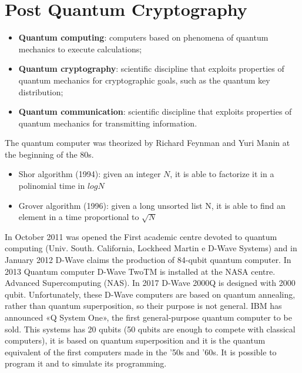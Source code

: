 \documentclass[a4paper, 10pt, titlepage]{article}
\begin{document}
\section{Post Quantum Cryptography}
\begin{itemize}
\item \textbf{Quantum computing}: computers based on phenomena of quantum mechanics to execute calculations;
\item \textbf{Quantum cryptography}: scientific discipline that exploits properties of quantum mechanics for cryptographic goals, such as the quantum key distribution;
\item \textbf{Quantum communication}: scientific discipline that exploits properties of quantum mechanics for transmitting information.
\end{itemize}
The quantum computer was theorized by Richard Feynman and Yuri Manin at the beginning of the 80s.
\begin{itemize}
\item Shor algorithm (1994): given an integer $N$, it is able to  factorize it in a polinomial time in $log N$
\item Grover algorithm (1996): given a long unsorted list N, it is able to find an element in a time proportional to $\sqrt{N}$
\end{itemize}
In October 2011 was opened the First academic centre devoted to quantum computing (Univ. South. California, Lockheed Martin e D-Wave Systems) and in January 2012 D-Wave claims the production of 84-qubit
quantum computer. In 2013 Quantum computer D-Wave TwoTM is installed at the NASA centre. Advanced Supercomputing (NAS). In 2017 D-Wave 2000Q is designed with 2000 qubit. Unfortunately, these D-Wave computers are based on quantum annealing, rather than quantum superposition, so their purpose is not general.
IBM has announced «Q System One», the first general-purpose quantum
computer to be sold. This systems has 20 qubits (50 qubits are enough to compete with classical computers), it is based on quantum superposition and it is the quantum equivalent of the first computers made in the '50s and '60s. It is possible to program it and to simulate its programming. 
\end{document}
